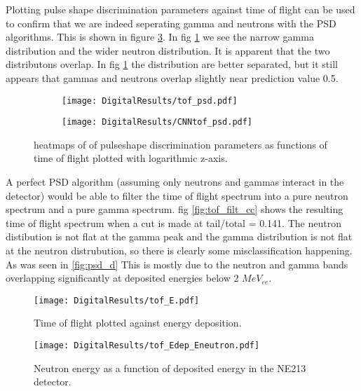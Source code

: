 \documentclass[main.tex]{subfiles}
\begin{document}
Plotting pulse shape discrimination parameters against time of flight can be used to confirm that we are indeed seperating gamma and neutrons with the PSD algorithms. This is shown in figure \ref{fig:tof_cc_tof_cnn}. In fig \ref{fig:tof_digi_cc} we see the narrow gamma distribution and the wider neutron distribution. It is apparent that the two distributons overlap. In fig \ref{fig:tof_digi_cc} the distribution are better separated, but it still appears that gammas and neutrons overlap slightly near prediction value 0.5.
\begin{figure}
    \centering
    \begin{subfigure}[ht]{\textwidth}
        \texttt{[image: DigitalResults/tof\_psd.pdf]}
        \caption{}
        \label{fig:tof_digi_cc}
    \end{subfigure}
	\begin{subfigure}[ht]{\textwidth}
        \texttt{[image: DigitalResults/CNNtof\_psd.pdf]}
        \caption{}
        \label{fig:tof_digi_cnn}
    \end{subfigure}
    \caption{heatmaps of of pulseshape discrimination parameters as functions of time of flight plotted with logarithmic z-axis.}
    \label{fig:tof_cc_tof_cnn}
\end{figure}

A perfect PSD algorithm (assuming only neutrons and gammas interact in the detector) would be able to filter the time of flight spectrum into a pure neutron spectrum and a pure gamma spectrum. fig \ref{fig:tof_filt_cc} shows the resulting time of flight spectrum when a cut is made at tail/total = 0.141. The neutron distibution is not flat at the gamma peak and the gamma distribution is not flat at the neutron distrubution, so there is clearly some misclassification happening. As was seen in \ref{fig:psd_d} This is mostly due to the neutron and gamma bands overlapping significantly at deposited energies below 2 $MeV_{ee}$.


\begin{figure}[ht]
    \centering
        \texttt{[image: DigitalResults/tof\_E.pdf]}
        \caption{Time of flight plotted against energy deposition.}
    \label{fig:tof_E_d} 
\end{figure}

\begin{figure}[ht]
    \centering
        \texttt{[image: DigitalResults/tof\_Edep\_Eneutron.pdf]}
        \caption{Neutron energy as a function of deposited energy in the NE213 detector.}
    \label{fig:tof_Edep_Eneutron_d} 
\end{figure}
\end{document}
